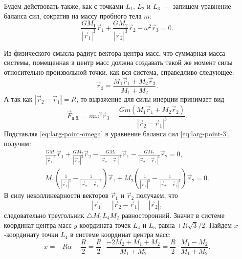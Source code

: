 Будем действовать также, как с точками $L_1$, $L_2$ и $L_3$~--- запишем уравнение баланса сил, сократив на массу пробного тела $m$:
\begin{equation}
    \frac{G M_1}{\left|\vec{r}_1 \right|^3 } \vec{r}_1 + \frac{G M_2}{\left| \vec{r}_2 \right|^3} \vec{r}_2 - \omega^2 \vec{r}_3 = 0.
    \label{eq:larg-point-3}
\end{equation}

Из физического смысла радиус-вектора центра масс, что суммарная масса системы, помещенная в центр масс должна создавать такой же момент силы относительно произвольной точки, как вся система, справедливо следующее:
\begin{equation*}
    \vec{r}_3 = \frac{M_1 \vec{r}_1 + M_2 \vec{r}_2}{M_1 + M_2}.
    \label{eq:larg-point-r_3}
\end{equation*}
А так как $| \vec{r}_2 - \vec{r}_1| = R$, то выражение для силы инерции принимает вид
\begin{equation}
    \vec{F}_\text{ц.б.} = m \omega^2 \vec{r}_3 = \frac{ G m (M_1 \vec{r}_1 + M_2 \vec{r}_2)}{\left| \vec{r}_2 - \vec{r}_1 \right|^3}.
    \label{eq:larg-point-omega}
\end{equation}
Подставляя \eqref{eq:larg-point-omega} в уравнение баланса сил \eqref{eq:larg-point-3}, получим:
\begin{gather*}
    \frac{G M_1}{\left|\vec{r}_1 \right|^3 } \vec{r}_1 + \frac{G M_2}{\left| \vec{r}_2 \right|^3} \vec{r}_2 - \frac{G M_1}{\left|\vec{r}_2 - \vec{r}_1 \right|^3 } \vec{r}_1 - \frac{G M_2}{\left| \vec{r}_2 - \vec{r}_1 \right|^3} \vec{r}_2 = 0,\\
    M_1 \left(\frac{1}{\left| \vec{r}_1 \right|^3} - \frac{1}{\left|\vec{r}_2 - \vec{r}_1 \right|^3} \right) \vec{r}_1 + M_2 \left(\frac{1}{\left| \vec{r}_2 \right|^3} - \frac{1}{\left|\vec{r}_2 - \vec{r}_1 \right|^3} \right) \vec{r}_2 = 0.
\end{gather*}
В силу неколлинеарности векторов $\vec{r}_1$ и $\vec{r}_2$ получаем, что
\begin{equation}
    |\vec{r}_1| = |\vec{r}_2 - \vec{r}_1 | = |\vec{r}_2|,
\end{equation}
следовательно треугольник $\triangle M_1 L_4 M_2$ равносторонний. Значит в системе координат центра масс $y$-координата точек $L_4$ и $L_5$ равна $\pm R\sqrt{3}/2$. Найдем $x$-координату точки $L_4$ в системе координат центра масс:
\begin{equation*}
    x = -R\alpha + \frac{R}{2} = \frac{R}{2} \cdot \frac{-2 M_2 + M_1 + M_2}{M_1 + M_2} = \frac{R}{2} \cdot \frac{M_1 - M_2}{M_1 + M_2}.
\end{equation*}
